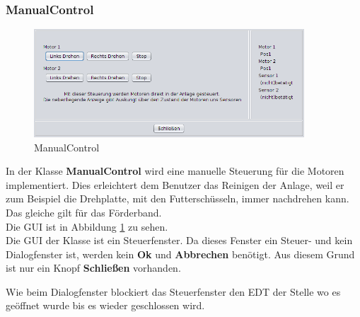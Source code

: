 \subsubsection{ManualControl}
  \begin{figure}[H]
    \includegraphics[width=0.90\textwidth]{Bilder/GUI/ManualControl}
    \caption{ManualControl}
  \label{ManualControl}
  \end{figure}
In der Klasse \textbf{ManualControl} wird eine manuelle Steuerung für die Motoren implementiert. Dies erleichtert dem Benutzer das Reinigen der Anlage, weil er zum Beispiel die Drehplatte, mit den Futterschüsseln, immer nachdrehen kann. Das gleiche gilt für das Förderband.
\\ Die GUI ist in Abbildung \ref{ManualControl} zu sehen.
\\ Die GUI der Klasse ist ein Steuerfenster. Da dieses Fenster ein Steuer- und kein Dialogfenster ist, werden kein \textbf{Ok} und \textbf{Abbrechen} benötigt. Aus diesem Grund ist nur ein Knopf \textbf{Schließen} vorhanden.

\vspace{10pt}

Wie beim Dialogfenster blockiert das Steuerfenster den EDT der Stelle wo es geöffnet wurde bis es wieder geschlossen wird.

\vspace{10pt}

